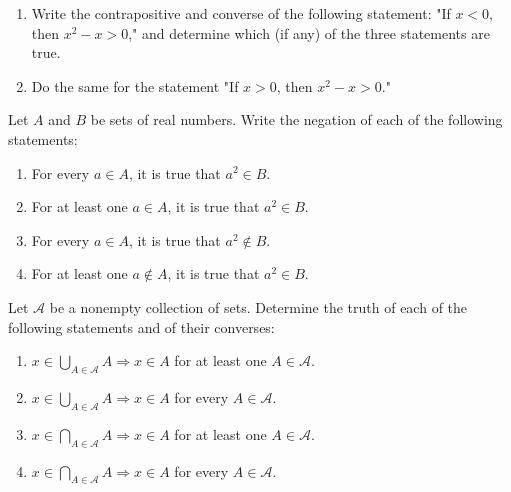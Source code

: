   \begin{exercise}[Munkres 1.3]
    \begin{enumerate}
      \item Write the contrapositive and converse of the following statement: "If $x < 0$, then $x^2 - x > 0$," and determine which (if any) of the three statements are true.
      \item Do the same for the statement "If $x > 0$, then $x^2 - x > 0$."
    \end{enumerate}
  \end{exercise}
  \begin{solution}
    
  \end{solution}

  \begin{exercise}[Munkres 1.4]
    Let $A$ and $B$ be sets of real numbers. Write the negation of each of the following statements:
    \begin{enumerate}
      \item For every $a \in A$, it is true that $a^2 \in B$.
      \item For at least one $a \in A$, it is true that $a^2 \in B$.
      \item For every $a \in A$, it is true that $a^2 \notin B$.
      \item For at least one $a \notin A$, it is true that $a^2 \in B$.
    \end{enumerate}
  \end{exercise}
  \begin{solution}
    
  \end{solution}

  \begin{exercise}[Munkres 1.5]
    Let $\mathcal{A}$ be a nonempty collection of sets. Determine the truth of each of the following statements and of their converses:
    \begin{enumerate}
      \item $x \in \bigcup_{A \in \mathcal{A}} A \Rightarrow x \in A$ for at least one $A \in \mathcal{A}$.
      \item $x \in \bigcup_{A \in \mathcal{A}} A \Rightarrow x \in A$ for every $A \in \mathcal{A}$.
      \item $x \in \bigcap_{A \in \mathcal{A}} A \Rightarrow x \in A$ for at least one $A \in \mathcal{A}$.
      \item $x \in \bigcap_{A \in \mathcal{A}} A \Rightarrow x \in A$ for every $A \in \mathcal{A}$.
    \end{enumerate}
  \end{exercise}
  \begin{solution}
    
  \end{solution}

